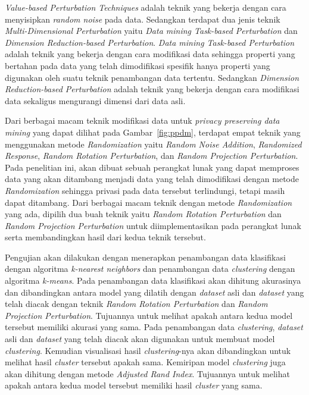 \textit{Value-based Perturbation Techniques} adalah teknik yang bekerja dengan cara menyisipkan \textit{random noise} pada data. Sedangkan terdapat dua jenis teknik \textit{Multi-Dimensional Perturbation} yaitu \textit{Data mining Task-based Perturbation} dan \textit{Dimension Reduction-based Perturbation}. \textit{Data mining Task-based Perturbation} adalah teknik yang bekerja dengan cara modifikasi data sehingga properti yang bertahan pada data yang telah dimodifikasi spesifik hanya properti yang digunakan oleh suatu teknik penambangan data tertentu. Sedangkan \textit{Dimension Reduction-based Perturbation} adalah teknik yang bekerja dengan cara modifikasi data sekaligus mengurangi dimensi dari data asli.

Dari berbagai macam teknik modifikasi data untuk \textit{privacy preserving data mining} yang dapat dilihat pada Gambar~\ref{fig:ppdm}, terdapat empat teknik yang menggunakan metode \textit{Randomization} yaitu \textit{Random Noise Addition}, \textit{Randomized Response}, \textit{Random Rotation Perturbation}, dan \textit{Random Projection Perturbation}. Pada penelitian ini, akan dibuat sebuah perangkat lunak yang dapat memproses data yang akan ditambang menjadi data yang telah dimodifikasi dengan metode \textit{Randomization} sehingga privasi pada data tersebut terlindungi, tetapi masih dapat ditambang. Dari berbagai macam teknik dengan metode \textit{Randomization} yang ada, dipilih dua buah teknik yaitu \textit{Random Rotation Perturbation} dan \textit{Random Projection Perturbation} untuk diimplementasikan pada perangkat lunak serta membandingkan hasil dari kedua teknik tersebut.

Pengujian akan dilakukan dengan menerapkan penambangan data klasifikasi dengan algoritma \textit{k-nearest neighbors} dan penambangan data \textit{clustering} dengan algoritma \textit{k-means}. Pada penambangan data klasifikasi akan dihitung akurasinya dan dibandingkan antara model yang dilatih dengan \textit{dataset} asli dan \textit{dataset} yang telah diacak dengan teknik \textit{Random Rotation Perturbation} dan \textit{Random Projection Perturbation}. Tujuannya untuk melihat apakah antara kedua model tersebut memiliki akurasi yang sama. Pada penambangan data \textit{clustering}, \textit{dataset} asli dan \textit{dataset} yang telah diacak akan digunakan untuk membuat model \textit{clustering}. Kemudian visualisasi hasil \textit{clustering}-nya akan dibandingkan untuk melihat hasil \textit{cluster} tersebut apakah sama. Kemiripan model \textit{clustering} juga akan dihitung dengan metode \textit{Adjusted Rand Index}. Tujuannya untuk melihat apakah antara kedua model tersebut memiliki hasil \textit{cluster} yang sama.

